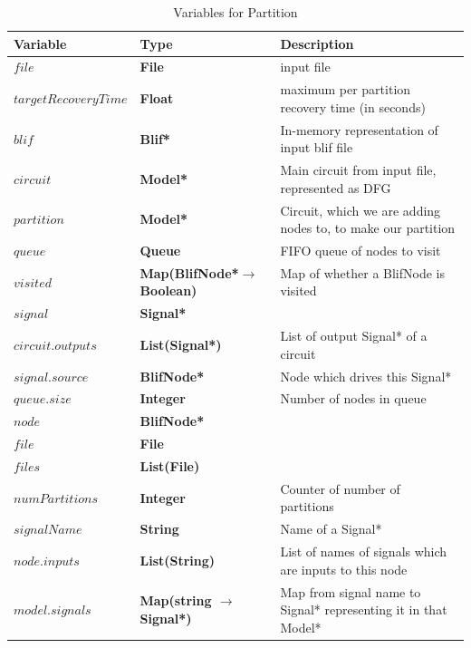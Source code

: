 \documentclass[12pt,final,oneside]{dwThesis} %
\begin{document}
   \begin{table}

      \begin{center}


         \begin{tabularx}
            {\linewidth}{llX} \toprule Variable & Type &
            Description\\
            \midrule $file$ &\textbf{ File  } &  input file\\

            $targetRecoveryTime$ &\textbf{ Float } &  maximum per partition
            recovery time (in seconds)\\
            $blif$ &\textbf{  Blif* } &  In-memory
            representation of input blif file\\
            $circuit$ &\textbf{   Model* }
            &  Main circuit from input file, represented as DFG\\
            $partition$
            &\textbf{   Model* } &  Circuit, which we are adding nodes to, to
            make our partition\\
            $queue$ &\textbf{  Queue } &  FIFO queue of
            nodes to visit\\
            $visited$ &\textbf{   Map(BlifNode*$\to$ Boolean)}
            &  Map of whether a BlifNode is visited\\
            $signal$ &\textbf{
               Signal* } &  \\
            $circuit.outputs$ &\textbf{  List(Signal*) } &
            List of output Signal* of a circuit\\
            $signal.source$ &\textbf{
               BlifNode* } &  Node which drives this Signal*\\
            $queue.size$
            &\textbf{ Integer } &  Number of nodes in queue\\
            $node$ &\textbf{
               BlifNode* } &  \\
            $file$ &\textbf{  File } &  \\
            $files$
            &\textbf{  List(File) } &  \\
            $numPartitions$ &\textbf{ Integer } &
            Counter of number of partitions\\
            $signalName$ &\textbf{ String } &
            Name of a Signal*\\
            $node.inputs$ &\textbf{  List(String) } &  List
            of names of signals which are inputs to this node\\
            $model.signals$
            &\textbf{  Map(string $\to$ Signal*) } &  Map from signal name to
            Signal* representing it in that Model*\\
            \bottomrule 
         \end{tabularx}

         \caption{Variables for Partition} \label{varPart} 
      \end{center}


   \end{table}
\end{document}
